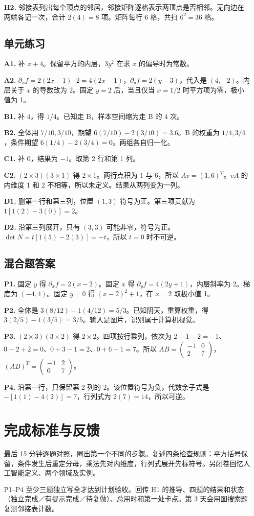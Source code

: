 \documentclass[UTF8,a4paper,11pt]{ctexart}
\begin{document}
\textbf{H2.} 邻接表列出每个顶点的邻居，邻接矩阵逐格表示两顶点是否相邻。无向边在两端各记一次，合计 $2(4)=8$ 项。矩阵每行 6 格，共扫 $6^2=36$ 格。

\subsection{单元练习}
\textbf{A1.} 补 $x+4$。保留平方的内层，$3y^2$ 在求 $x$ 的偏导时为常数。

\textbf{A2.} $\partial_x f=2(2x-1)\cdot2=4(2x-1)$，$\partial_y f=2(y-3)$，代入是 $(4,-2)$。内层关于 $x$ 的导数改为 2。固定 $y=2$ 后，当且仅当 $x=1/2$ 时平方项为零，极小值为 1。

\textbf{B1.} 补 4，得 $1/4$。已知走 B，样本空间缩为走 B 的 4 次。

\textbf{B2.} 全体用 $7/10,3/10$，期望 $6(7/10)-2(3/10)=3.6$。B 的权重为 $1/4,3/4$，条件期望 $6(1/4)-2(3/4)=0$。两组各自归一化。

\textbf{C1.} 补 0，结果为 $-1$。取第 2 行和第 1 列。

\textbf{C2.} $(2\times3)(3\times1)$ 得 $2\times1$。两行点积为 $1$ 与 $6$，所以 $Av=(1,6)^T$。$vA$ 的内维度 1 和 2 不相等，所以未定义。结果从两列变为一列。

\textbf{D1.} 删第一行和第三列，位置 $(1,3)$ 符号为正。第三项贡献为 $1[1(2)-3(0)]=2$。

\textbf{D2.} 沿第三列展开，只有 $(3,3)$ 可能非零，符号为正。$\det N=t[1(5)-2(3)]=-t$，所以 $t=0$ 时不可逆。

\clearpage
\subsection{混合题答案}
\textbf{P1.} 固定 $y$ 得 $\partial_x f=2(x-2)$。固定 $x$ 得 $\partial_y f=4(2y+1)$，内层斜率为 2。梯度为 $(-4,4)$。固定 $y=0$ 得 $(x-2)^2+1$，在 $x=2$ 取极小值 1。

\textbf{P2.} 全体是 $3(8/12)-1(4/12)=5/3$。已知阴天，重算权重，得 $3(2/5)-1(3/5)=3/5$。输入是图片，识别属于计算机视觉。

\textbf{P3.} $(2\times3)(3\times2)$ 得 $2\times2$。四项按行乘列，依次为 $2-1-2=-1$、$0-2+2=0$、$0+3-1=2$、$0+6+1=7$。所以 $AB=\begin{pmatrix}-1&0\\2&7\end{pmatrix}$，$(AB)^T=\begin{pmatrix}-1&2\\0&7\end{pmatrix}$。

\textbf{P4.} 沿第一行，只保留第 2 列的 2。该位置符号为负，代数余子式是 $-[1(1)-4(2)]=7$，行列式为 $2(7)=14$，所以可逆。

\section{完成标准与反馈}
最后 15 分钟逐题对照，圈出第一个不同的步骤。复述四条检查规则：平方括号保留，条件发生后重定分母，乘法先对内维度，行列式展开先标符号。另闭卷回忆人工智能定义、两个领域及实例。

P1–P4 至少三题独立写全才达到计划验收。回传 H1 的推导、四题的结果和状态（独立完成／有提示完成／待复做）、总用时和第一处卡点。第 3 天会用图搜索题复测邻接表计数。
\end{document}
